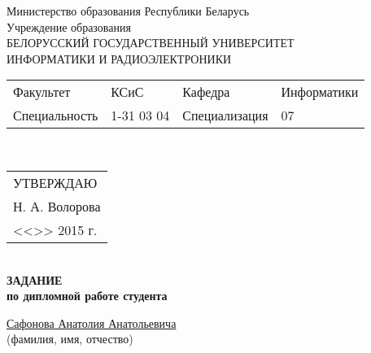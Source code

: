 {
  \thispagestyle{empty}
  \setlength{\parindent}{0em}

  \newcommand{\lineunderscore}{\uline{\hspace*{\fill}}}

  \begin{center}
    Министерство образования Республики Беларусь\\
    Учреждение образования\\
    БЕЛОРУССКИЙ ГОСУДАРСТВЕННЫЙ УНИВЕРСИТЕТ \\
    ИНФОРМАТИКИ И РАДИОЭЛЕКТРОНИКИ\\[1em]


  \begin{minipage}{\textwidth}
    \begin{flushleft}
      \begin{tabular}{ p{}p{}p{}p{} @{} }
        Факультет & КСиС & Кафедра & Информатики \\
        Специальность   & 1-31 03 04 & Специализация & 07
      \end{tabular}
    \end{flushleft}
  \end{minipage}\\[1em]

  \begin{minipage}{\textwidth}
    \begin{flushright}
      \begin{tabular}{p{}}
        УТВЕРЖДАЮ \\[0.5em]
        \underline{\hspace*{7em}} Н. А. Волорова \\
        <<\underline{\hspace*{4ex}}>> \underline{\hspace*{7em}} 2015 г.
      \end{tabular}
    \end{flushright}
  \end{minipage}\\[1em]

  \textbf{ЗАДАНИЕ} \\
  \textbf{по дипломной работе студента}

  \lineunderscore\uline{Сафонова Анатолия Анатольевича}\lineunderscore \\
  {\small (фамилия, имя, отчество) }

  \end{center}

}

